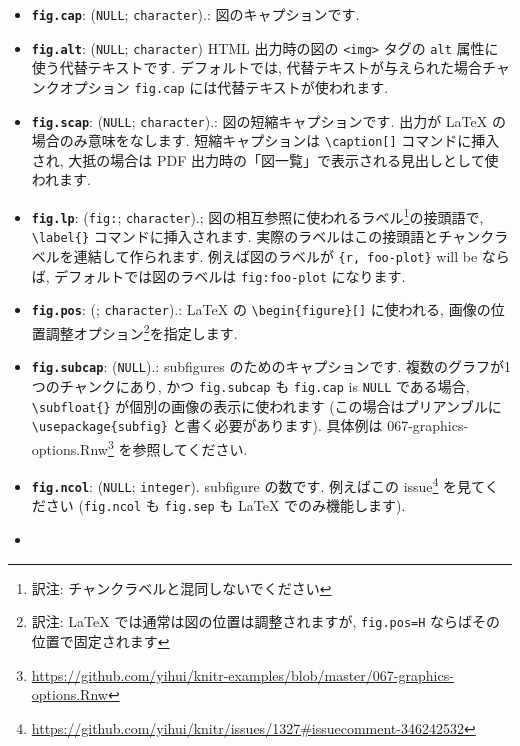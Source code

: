 \documentclass[
  11pt,
]{bxjsreport}
\renewcommand{\href}[2]{#2\footnote{\url{#1}}}
\begin{document}
\begin{itemize}
\item
  \textbf{\texttt{fig.cap}}: (\texttt{NULL}; \texttt{character}).: 図のキャプションです.
\item
  \textbf{\texttt{fig.alt}}: (\texttt{NULL}; \texttt{character}) HTML 出力時の図の \texttt{\textless{}img\textgreater{}} タグの \texttt{alt} 属性に使う代替テキストです. デフォルトでは, 代替テキストが与えられた場合チャンクオプション \texttt{fig.cap} には代替テキストが使われます.
\item
  \textbf{\texttt{fig.scap}}: (\texttt{NULL}; \texttt{character}).: 図の短縮キャプションです. 出力が LaTeX の場合のみ意味をなします. 短縮キャプションは \texttt{\textbackslash{}caption{[}{]}} コマンドに挿入され, 大抵の場合は PDF 出力時の「図一覧」で表示される見出しとして使われます.
\item
  \textbf{\texttt{fig.lp}}: (\texttt{\textquotesingle{}fig:\textquotesingle{}}; \texttt{character}).; 図の相互参照に使われるラベル\footnote{訳注: チャンクラベルと混同しないでください}の接頭語で, \texttt{\textbackslash{}label\{\}} コマンドに挿入されます. 実際のラベルはこの接頭語とチャンクラベルを連結して作られます. 例えば図のラベルが \texttt{\textasciigrave{}\textasciigrave{}\textasciigrave{}\{r,\ foo-plot\}} will be ならば, デフォルトでは図のラベルは \texttt{fig:foo-plot} になります.
\item
  \textbf{\texttt{fig.pos}}: (\texttt{\textquotesingle{}\textquotesingle{}}; \texttt{character}).: LaTeX の \texttt{\textbackslash{}begin\{figure\}{[}{]}} に使われる, 画像の位置調整オプション\footnote{訳注: LaTeX では通常は図の位置は調整されますが, \texttt{fig.pos=\textquotesingle{}H\textquotesingle{}} ならばその位置で固定されます}を指定します.
\item
  \textbf{\texttt{fig.subcap}}: (\texttt{NULL}).: subfigures のためのキャプションです. 複数のグラフが1つのチャンクにあり, かつ \texttt{fig.subcap} も \texttt{fig.cap} is \texttt{NULL} である場合, \texttt{\textbackslash{}subfloat\{\}} が個別の画像の表示に使われます (この場合はプリアンブルに \texttt{\textbackslash{}usepackage\{subfig\}} と書く必要があります). 具体例は \href{https://github.com/yihui/knitr-examples/blob/master/067-graphics-options.Rnw}{067-graphics-options.Rnw} を参照してください.
\item
  \textbf{\texttt{fig.ncol}}: (\texttt{NULL}; \texttt{integer}). subfigure の数です. 例えば\href{https://github.com/yihui/knitr/issues/1327\#issuecomment-346242532}{この issue} を見てください (\texttt{fig.ncol} も \texttt{fig.sep} も LaTeX でのみ機能します).
\item

\end{itemize}
\end{document}
